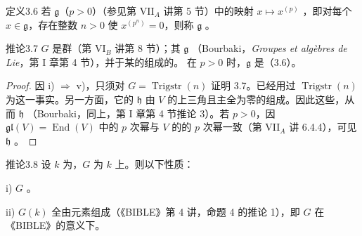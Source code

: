 \begin{SGAresult}{定义}{3.6}
若 $\mathfrak g$（$p>0$）（参见第 VII$_A$ 讲第 5 节）中的映射 $x\mapsto x^{(p)}$ ，即对每个 $x\in\mathfrak g$，存在整数 $n>0$ 使 $x^{(p^n)}=0$，则称 $\mathfrak g$ 。
\end{SGAresult}
\begin{SGAresult}{推论}{3.7}
 $G$ 是群（第 VI$_B$ 讲第 8 节）；其 $\mathfrak g$ （Bourbaki，\textit{Groupes et algèbres de Lie}，第 I 章第 4 节），并于某的组成的。
在 $p>0$ 时，$\mathfrak g$ 是（3.6）。
\end{SGAresult}
\begin{proof}
因 i) $\Rightarrow$ v)，只须对 $G=\operatorname{Trigstr}(n)$ 证明 3.7。已经用过 $\operatorname{Trigstr}(n)$ 为这一事实。另一方面，它的 $\mathfrak h$ 由 $V$ 的上三角且主全为零的组成。因此这些，从而 $\mathfrak h$ （Bourbaki，同上，第 I 章第 4 节推论 3）。若 $p>0$，因 $\mathfrak{gl}(V)=\operatorname{End}(V)$ 中的 $p$ 次幂与 $V$ 的的 $p$ 次幂一致（第 VII$_A$ 讲 6.4.4），可见 $\mathfrak h$ 。
\end{proof}
\begin{SGAresult}{推论}{3.8}
设 $k$ 为，$G$ 为 $k$ 上。则以下性质：

i) $G$ 。

ii) $G(k)$ 全由元素组成（《BIBLE》第 4 讲，命题 4 的推论 1），即 $G$ 在《BIBLE》的意义下。
\end{SGAresult}
